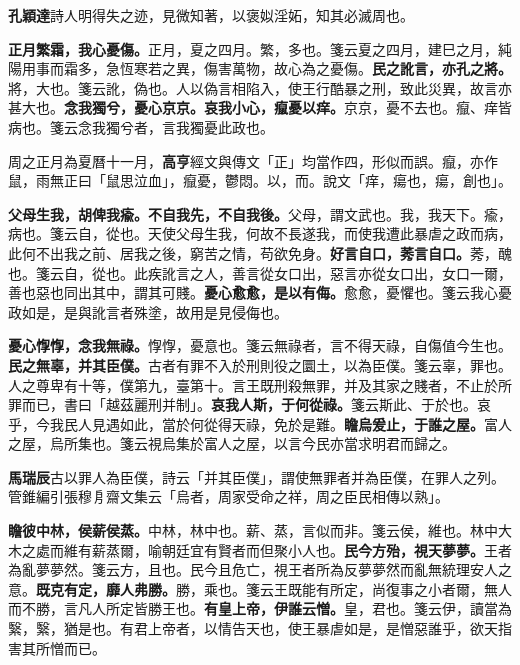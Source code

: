 \begin{quoting}\textbf{孔穎達}詩人明得失之迹，見微知著，以褒姒淫妬，知其必滅周也。\end{quoting}

\textbf{正月繁霜，我心憂傷。}{\footnotesize 正月，夏之四月。繁，多也。箋云夏之四月，建巳之月，純陽用事而霜多，急恆寒若之異，傷害萬物，故心為之憂傷。}\textbf{民之訛言，亦孔之將。}{\footnotesize 將，大也。箋云訛，偽也。人以偽言相陷入，使王行酷暴之刑，致此災異，故言亦甚大也。}\textbf{念我獨兮，憂心京京。哀我小心，癙憂以痒。}{\footnotesize 京京，憂不去也。癙、痒皆病也。箋云念我獨兮者，言我獨憂此政也。}

\begin{quoting}周之正月為夏曆十一月，\textbf{高亨}經文與傳文「正」均當作四，形似而誤。癙，亦作鼠，雨無正曰「鼠思泣血」，癙憂，鬱悶。以，而。說文「痒，瘍也，瘍，創也」。\end{quoting}

\textbf{父母生我，胡俾我瘉。不自我先，不自我後。}{\footnotesize 父母，謂文武也。我，我天下。瘉，病也。箋云自，從也。天使父母生我，何故不長遂我，而使我遭此暴虐之政而病，此何不出我之前、居我之後，窮苦之情，苟欲免身。}\textbf{好言自口，莠言自口。}{\footnotesize 莠，醜也。箋云自，從也。此疾訛言之人，善言從女口出，惡言亦從女口出，女口一爾，善也惡也同出其中，謂其可賤。}\textbf{憂心愈愈，是以有侮。}{\footnotesize 愈愈，憂懼也。箋云我心憂政如是，是與訛言者殊塗，故用是見侵侮也。}

\textbf{憂心惸惸，念我無祿。}{\footnotesize 惸惸，憂意也。箋云無祿者，言不得天祿，自傷值今生也。}\textbf{民之無辜，并其臣僕。}{\footnotesize 古者有罪不入於刑則役之圜土，以為臣僕。箋云辜，罪也。人之尊卑有十等，僕第九，臺第十。言王既刑殺無罪，并及其家之賤者，不止於所罪而已，書曰「越茲麗刑并制」。}\textbf{哀我人斯，于何從祿。}{\footnotesize 箋云斯此、于於也。哀乎，今我民人見遇如此，當於何從得天祿，免於是難。}\textbf{瞻烏爰止，于誰之屋。}{\footnotesize 富人之屋，烏所集也。箋云視烏集於富人之屋，以言今民亦當求明君而歸之。}

\begin{quoting}\textbf{馬瑞辰}古以罪人為臣僕，詩云「并其臣僕」，謂使無罪者并為臣僕，在罪人之列。管錐編引張穆㐆齋文集云「烏者，周家受命之祥，周之臣民相傳以熟」。\end{quoting}

\textbf{瞻彼中林，侯薪侯蒸。}{\footnotesize 中林，林中也。薪、蒸，言似而非。箋云侯，維也。林中大木之處而維有薪蒸爾，喻朝廷宜有賢者而但聚小人也。}\textbf{民今方殆，視天夢夢。}{\footnotesize 王者為亂夢夢然。箋云方，且也。民今且危亡，視王者所為反夢夢然而亂無統理安人之意。}\textbf{既克有定，靡人弗勝。}{\footnotesize 勝，乘也。箋云王既能有所定，尚復事之小者爾，無人而不勝，言凡人所定皆勝王也。}\textbf{有皇上帝，伊誰云憎。}{\footnotesize 皇，君也。箋云伊，讀當為繄，繄，猶是也。有君上帝者，以情告天也，使王暴虐如是，是憎惡誰乎，欲天指害其所憎而已。}

